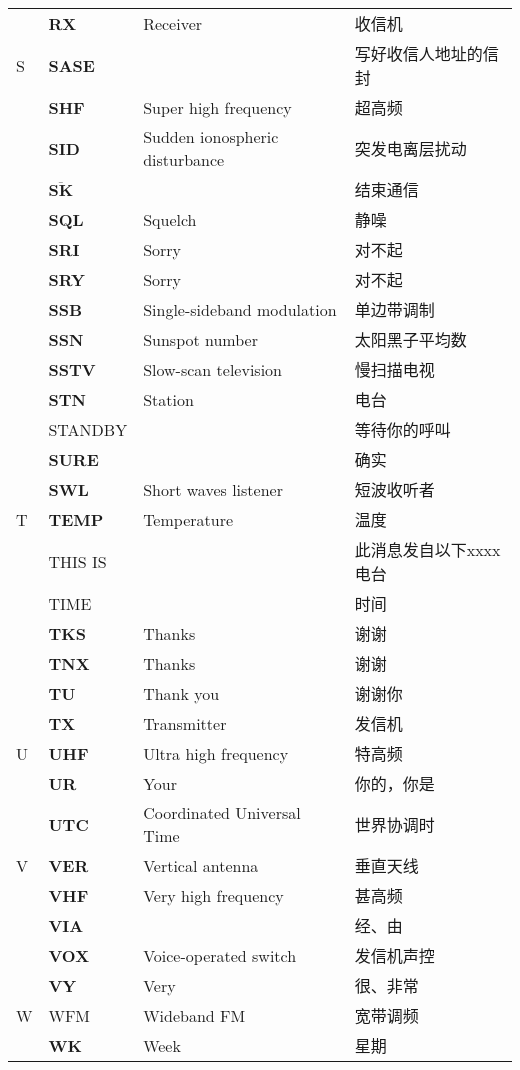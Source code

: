 \begin{longtable}[l]{llll}
& \textbf{RX} & Receiver & 收信机 \\
S & \textbf{SASE} & & 写好收信人地址的信封 \\
& \textbf{SHF} & Super high frequency & 超高频 \\
& \textbf{SID} & Sudden ionospheric disturbance & 突发电离层扰动 \\
& $\overline{\mathbf{S}\mathbf{K}}$ & & 结束通信 \\
& \textbf{SQL} & Squelch & 静噪 \\
& \textbf{SRI} & Sorry & 对不起 \\
& \textbf{SRY} & Sorry & 对不起 \\
& \textbf{SSB} & Single-sideband modulation & 单边带调制 \\
& \textbf{SSN} & Sunspot number & 太阳黑子平均数 \\
& \textbf{SSTV} & Slow-scan television & 慢扫描电视 \\
& \textbf{STN} & Station & 电台 \\
& STANDBY & & 等待你的呼叫 \\
& \textbf{SURE} & & 确实 \\
& \textbf{SWL} & Short waves listener & 短波收听者 \\
T & \textbf{TEMP} & Temperature & 温度 \\
& THIS IS & & 此消息发自以下xxxx电台 \\
& TIME & & 时间 \\
& \textbf{TKS} & Thanks & 谢谢 \\
& \textbf{TNX} & Thanks & 谢谢 \\
& \textbf{TU} & Thank you & 谢谢你 \\
& \textbf{TX} & Transmitter & 发信机 \\
U & \textbf{UHF} & Ultra high frequency & 特高频 \\
& \textbf{UR} & Your & 你的，你是 \\
& \textbf{UTC} & Coordinated Universal Time & 世界协调时 \\%
V & \textbf{VER} & Vertical antenna & 垂直天线 \\
& \textbf{VHF} & Very high frequency & 甚高频 \\
& \textbf{VIA} & & 经、由 \\
& \textbf{VOX} & Voice-operated switch & 发信机声控 \\
& \textbf{VY} & Very & 很、非常 \\
W & WFM & Wideband FM & 宽带调频 \\
& \textbf{WK} & Week & 星期 \\

\end{longtable}
